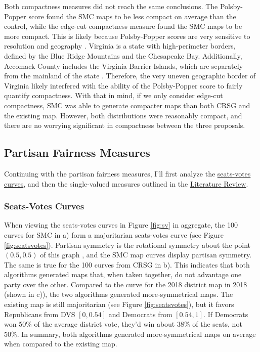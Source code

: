 Both compactness measures did not reach the same conclusions. The Polsby-Popper score found the SMC maps to be less compact on average than the control, while the edge-cut compactness measure found the SMC maps to be more compact. This is likely because Polsby-Popper scores are very sensitive to resolution and geography \parencite{mccartan2020}. Virginia is a state with high-perimeter borders, defined by the Blue Ridge Mountains and the Chesapeake Bay. Additionally, Accomack County includes the Virginia Barrier Islands, which are separately from the mainland of the state \parencite{unitedstatesgeologicalsurvey2021}. Therefore, the very uneven geographic border of Virginia likely interfered with the ability of the Polsby-Popper score to fairly quantify compactness. With that in mind, if we only consider edge-cut compactness, SMC was able to generate compacter maps than both CRSG and the existing map. However, both distributions were reasonably compact, and there are no worrying significant in compactness between the three proposals. 

\subsection{Partisan Fairness Measures}

Continuing with the partisan fairness measures, I'll first analyze the \hyperref[sec:seatsvotes]{seats-votes curves}, and then the single-valued measures outlined in the \hyperref[sec:litreview]{Literature Review}. 

\subsubsection{Seats-Votes Curves}

When viewing the seats-votes curves in Figure \ref{fig:sv} in aggregate, the 100 curves for SMC in a) form a majoritarian seats-votes curve (see Figure \ref{fig:seatsvotes}). Partisan symmetry is the rotational symmetry about the point $(0.5, 0.5)$ of this graph \parencite{katz2020}, and the SMC map curves display partisan symmetry. The same is true for the 100 curves from CRSG in b). This indicates that both algorithms generated maps that, when taken together, do not advantage one party over the other. Compared to the curve for the 2018 district map in 2018 (shown in c)), the two algorithms generated more-symmetrical maps. The existing map is still majoritarian (see Figure \ref{fig:seatsvotes}), but it favors Republicans from DVS $[0, 0.54]$ and Democrats from $[0.54, 1]$. If Democrats won 50\% of the average district vote, they'd win about 38\% of the seats, not 50\%. In summary, both algorithms generated more-symmetrical maps on average when compared to the existing map. 

